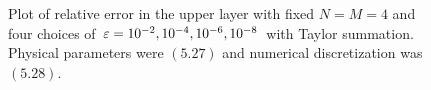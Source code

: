 \begin{figure}[H]
\vspace{3mm}
\caption{Plot of relative error in the upper layer with fixed $N = M     = 4$
    and four choices of $\varepsilon = 10^{-2}, 10^{-4}, 10^{-6}, 10^{-8}$
    with Taylor summation.
    Physical parameters were $(5.27)$ and numerical
    discretization was $(5.28)$.}
\label{Fig:N}
\end{figure}
%
\vspace{-40mm}

